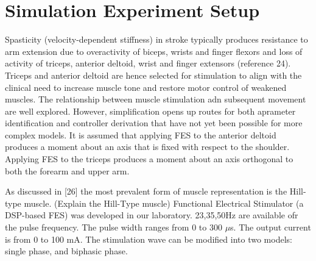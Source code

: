 \section{Simulation Experiment Setup}
Spasticity (velocity-dependent stiffness) in stroke typically produces resistance to arm extension due to overactivity of biceps, wrists and finger flexors and loss of activity of triceps, anterior deltoid, wrist and finger extensors (reference 24). \cite{IOL}
Triceps and anterior deltoid are hence selected for stimulation to align with the clinical need to increase muscle tone and restore motor control of weakened muscles. 
The relationship between muscle stimulation adn subsequent movement are well explored. However, simplification opens up routes for both aprameter identification and controller derivation that have not yet been possible for more complex models. \cite{IOL}
It is assumed that applying FES to the anterior deltoid produces a moment about an axis that is fixed with respect to the shoulder. Applying FES to the triceps produces a moment about an axis orthogonal to both the forearm and upper arm.\cite{IOL}

As discussed in [26] the most prevalent form of muscle representation is the Hill-type muscle. (Explain the Hill-Type muscle)
Functional Electrical Stimulator (a DSP-based FES) was developed in our laboratory. 23,35,50Hz are available ofr the pulse frequency. 
The pulse width ranges from 0 to 300 $\mu$s. The output current is from 0 to 100 mA. The stimulation wave can be modified into two models: single phase, and biphasic phase. \cite{NNPID}




